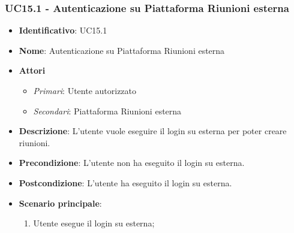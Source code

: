 \subsubsection{UC15.1 - Autenticazione su Piattaforma Riunioni esterna }
\begin{itemize}
	\item \textbf{Identificativo}: UC15.1
	\item \textbf{Nome}: Autenticazione su Piattaforma Riunioni esterna
	\item \textbf{Attori}
	\begin{itemize} 
		\item \textit{Primari}: Utente autorizzato
		\item \textit{Secondari}: Piattaforma Riunioni esterna
	\end{itemize}
	\item \textbf{Descrizione}: L'utente vuole eseguire il login su  esterna per poter creare riunioni.
	\item \textbf{Precondizione}: L'utente non ha eseguito il login su  esterna.
	\item \textbf{Postcondizione}: L'utente ha eseguito il login su  esterna.
	\item \textbf{Scenario principale}: \begin{enumerate}
		\item Utente esegue il login su  esterna; 
	\end{enumerate}
\end{itemize}

